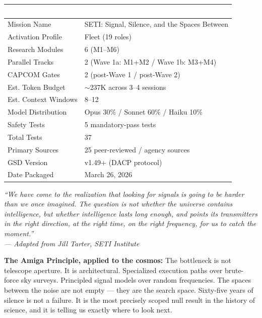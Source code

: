 \documentclass[11pt,letterpaper]{article}
\newcommand{\tableheader}[1]{\textbf{\sffamily\textcolor{white}{#1}}}
\begin{document}
\begin{center}
\begin{tabularx}{\textwidth}{L{5cm}X}
\toprule
{}
\tableheader{Metric} & \tableheader{Value} \\
\midrule
Mission Name & SETI: Signal, Silence, and the Spaces Between \\
Activation Profile & Fleet (19 roles) \\
Research Modules & 6 (M1--M6) \\
Parallel Tracks & 2 (Wave 1a: M1+M2 / Wave 1b: M3+M4) \\
CAPCOM Gates & 2 (post-Wave 1 / post-Wave 2) \\
Est. Token Budget & $\sim$237K across 3--4 sessions \\
Est. Context Windows & 8--12 \\
Model Distribution & Opus 30\% / Sonnet 60\% / Haiku 10\% \\
Safety Tests & 5 mandatory-pass tests \\
Total Tests & 37 \\
Primary Sources & 25 peer-reviewed / agency sources \\
GSD Version & v1.49+ (DACP protocol) \\
Date Packaged & March 26, 2026 \\
\bottomrule
\end{tabularx}
\end{center}

\vspace{2em}

\begin{quotebox}
\textit{``We have come to the realization that looking for signals is going to be harder than we once imagined. The question is not whether the universe contains intelligence, but whether intelligence lasts long enough, and points its transmitters in the right direction, at the right time, on the right frequency, for us to catch the moment.''\\
\hfill --- Adapted from Jill Tarter, SETI Institute}

\vspace{0.8em}
\textbf{\sffamily\textcolor{primary}{The Amiga Principle, applied to the cosmos:}} The bottleneck is not telescope aperture. It is architectural. Specialized execution paths over brute-force sky surveys. Principled signal models over random frequencies. The spaces between the noise are not empty --- they are the search space. Sixty-five years of silence is not a failure. It is the most precisely scoped null result in the history of science, and it is telling us exactly where to look next.
\end{quotebox}
\end{document}
